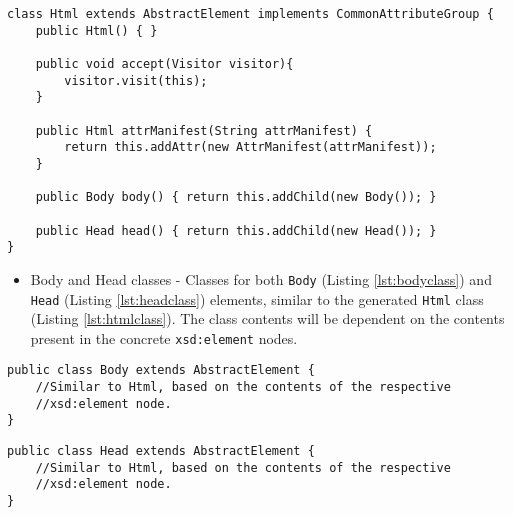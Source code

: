 
\begin{minipage}{\linewidth}
\begin{lstlisting}[caption={Html Element Class},captionpos=b,label={lst:htmlclass}]
class Html extends AbstractElement implements CommonAttributeGroup {
    public Html() { }
    
    public void accept(Visitor visitor){
		visitor.visit(this);    
    }
    
    public Html attrManifest(String attrManifest) {
        return this.addAttr(new AttrManifest(attrManifest));
    }
    
    public Body body() { return this.addChild(new Body()); }
        
    public Head head() { return this.addChild(new Head()); }
}
\end{lstlisting}
\end{minipage}

\begin{itemize}
	\item Body and Head classes - Classes for both \texttt{Body} (Listing \ref{lst:bodyclass}) and \texttt{Head} (Listing \ref{lst:headclass}) elements, similar to the generated \texttt{Html} class (Listing \ref{lst:htmlclass}). The class contents will be dependent on the contents present in the concrete \texttt{xsd:element} nodes.
\end{itemize}

\bigskip

\begin{minipage}{\linewidth}
\begin{lstlisting}[caption={Body Element Class},captionpos=b,label={lst:bodyclass}]
public class Body extends AbstractElement {
    //Similar to Html, based on the contents of the respective
    //xsd:element node.
}
\end{lstlisting}
\end{minipage}

\bigskip

\begin{minipage}{\linewidth}
\begin{lstlisting}[caption={Head Element Class},captionpos=b,label={lst:headclass}]
public class Head extends AbstractElement {
    //Similar to Html, based on the contents of the respective 
    //xsd:element node.
}
\end{lstlisting}
\end{minipage}

